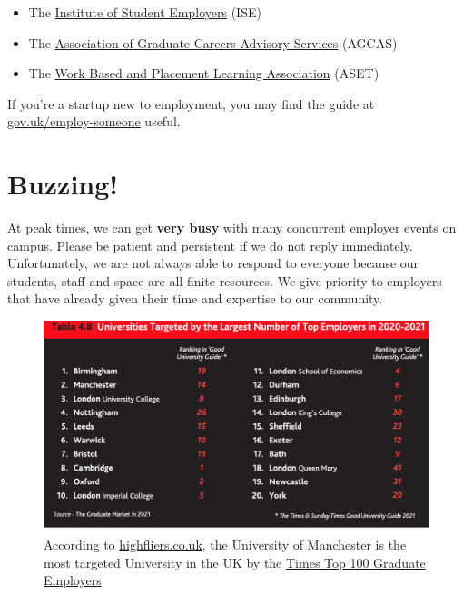 \documentclass[
  12pt,
]{book}
\providecommand{\tightlist}{%
  \setlength{\itemsep}{0pt}\setlength{\parskip}{0pt}}
\begin{document}
\begin{itemize}
\tightlist
\item
  The \href{https://ise.org.uk/}{Institute of Student Employers} (ISE)
\item
  The \href{https://www.agcas.org.uk}{Association of Graduate Careers Advisory Services} (AGCAS)
\item
  The \href{https://www.asetonline.org}{Work Based and Placement Learning Association} (ASET)
\end{itemize}

If you're a startup new to employment, you may find the guide at \href{https://www.gov.uk/employ-someone}{gov.uk/employ-someone} useful.

\hypertarget{buzzing}{%
\section{Buzzing!}\label{buzzing}}

At peak times, we can get \textbf{very busy} with many concurrent employer events on campus. \citep{highfliers2021} Please be patient and persistent if we do not reply immediately. Unfortunately, we are not always able to respond to everyone because our students, staff and space are all finite resources. We give priority to employers that have already given their time and expertise to our community.



\begin{figure}

{\centering \includegraphics[width=1\linewidth]{images/high-fliers-table-2021} 

}

\caption{According to \href{https://www.highfliers.co.uk}{highfliers.co.uk}, the University of Manchester is the most targeted University in the UK by the \href{https://www.top100graduateemployers.com}{Times Top 100 Graduate Employers} \citep{highfliers2021}}\label{fig:unnamed-chunk-4}
\end{figure}
\end{document}
